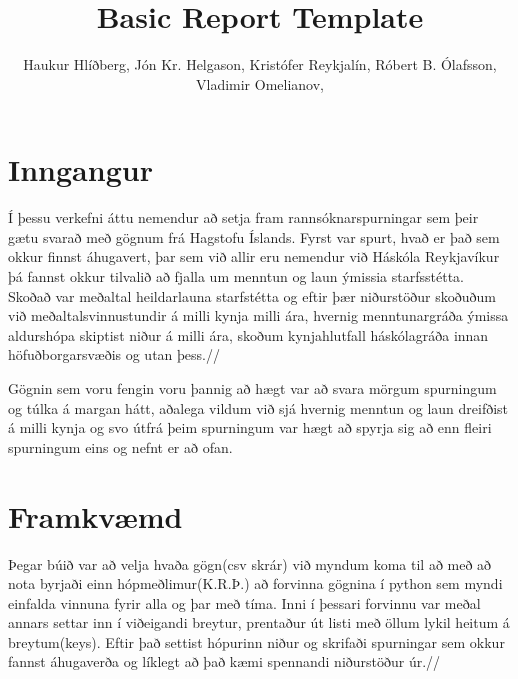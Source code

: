 \documentclass[12pt, svn, draft]{rureport}
\author{Haukur Hlíðberg, Jón Kr. Helgason, Kristófer Reykjalín, Róbert B. Ólafsson, Vladimir Omelianov,}  %
\title{Basic Report Template}  %
\begin{document}
\maketitle  %



\section{Inngangur} %

Í þessu verkefni áttu nemendur að setja fram rannsóknarspurningar sem þeir gætu svarað með gögnum frá Hagstofu Íslands. Fyrst var spurt, hvað er það sem okkur finnst áhugavert, þar sem við allir eru nemendur við Háskóla Reykjavíkur þá fannst okkur tilvalið að fjalla um  menntun og laun ýmissia starfsstétta.\\ 

Skoðað var meðaltal heildarlauna starfstétta og eftir þær niðurstöður skoðuðum við meðaltalsvinnustundir á milli kynja milli ára,  hvernig menntunargráða ýmissa aldurshópa skiptist niður á milli ára, skoðum kynjahlutfall háskólagráða innan höfuðborgarsvæðis og utan þess.// 

Gögnin sem voru fengin voru þannig að hægt var að svara mörgum spurningum og túlka á margan hátt, aðalega vildum við sjá hvernig menntun og laun dreifðist á milli kynja og svo útfrá þeim spurningum var hægt að spyrja sig að enn fleiri spurningum eins og nefnt er að ofan.





\section{Framkvæmd}

Þegar búið var að velja hvaða gögn(csv skrár) við myndum koma til að með að nota byrjaði einn hópmeðlimur(K.R.Þ.) að forvinna gögnina í python sem myndi einfalda vinnuna fyrir alla og þar með tíma. Inni í þessari forvinnu var meðal annars settar inn í viðeigandi breytur, prentaður út listi með öllum lykil heitum á breytum(keys). Eftir það settist hópurinn niður og skrifaði spurningar sem okkur fannst áhugaverða og líklegt að það kæmi spennandi niðurstöður úr.//
\end{document}
